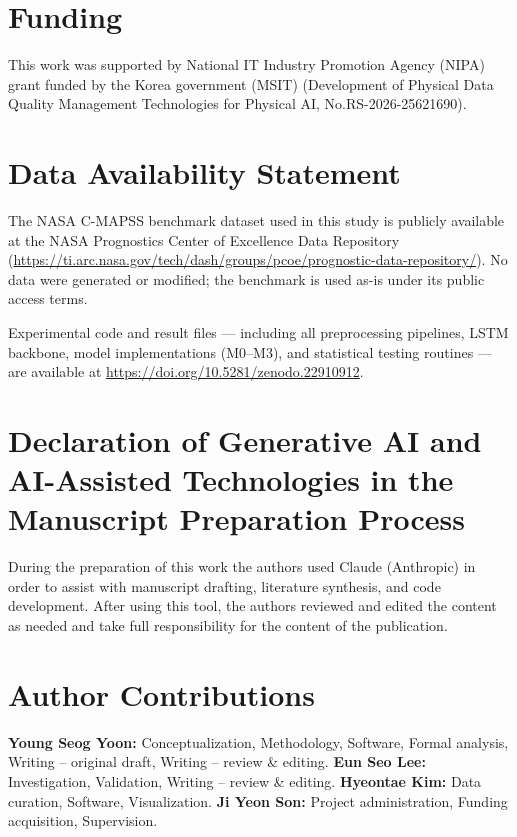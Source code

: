 \documentclass[preprint,10pt]{elsarticle}
\begin{document}
\section*{Funding}

This work was supported by National IT Industry Promotion Agency (NIPA) grant funded by the Korea government (MSIT) (Development of Physical Data Quality Management Technologies for Physical AI, No.RS-2026-25621690).

\section*{Data Availability Statement}

The NASA C-MAPSS benchmark dataset used in this study is publicly available at the NASA Prognostics Center of Excellence Data Repository (\url{https://ti.arc.nasa.gov/tech/dash/groups/pcoe/prognostic-data-repository/}). No data were generated or modified; the benchmark is used as-is under its public access terms.

Experimental code and result files — including all preprocessing pipelines, LSTM backbone, model implementations (M0--M3), and statistical testing routines — are available at \url{https://doi.org/10.5281/zenodo.22910912}.


\section*{Declaration of Generative AI and AI-Assisted Technologies in the
          Manuscript Preparation Process}

During the preparation of this work the authors used Claude (Anthropic) in order
to assist with manuscript drafting, literature synthesis, and code development.
After using this tool, the authors reviewed and edited the content as needed and
take full responsibility for the content of the publication.


\section*{Author Contributions}

\textbf{Young Seog Yoon:} Conceptualization, Methodology, Software, Formal analysis,
Writing -- original draft, Writing -- review \& editing.
\textbf{Eun Seo Lee:} Investigation, Validation, Writing -- review \& editing.
\textbf{Hyeontae Kim:} Data curation, Software, Visualization.
\textbf{Ji Yeon Son:} Project administration, Funding acquisition, Supervision.
\end{document}

